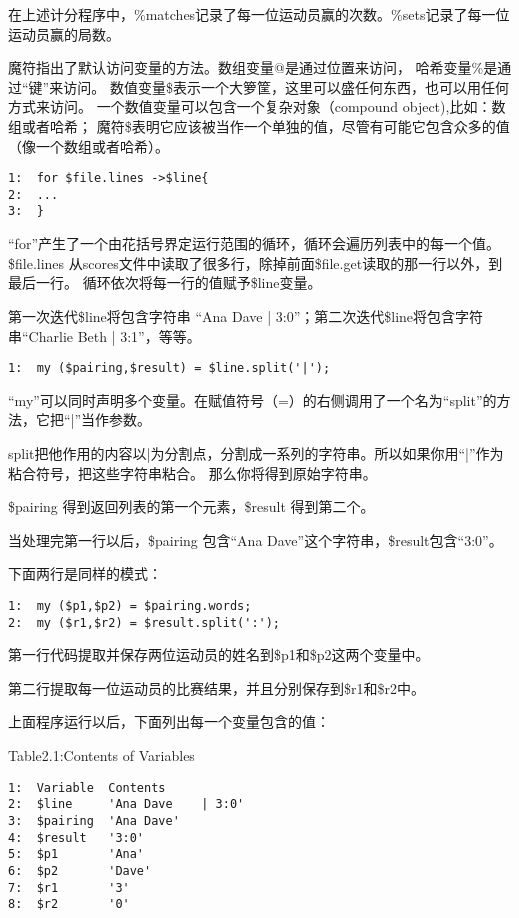\documentclass[11pt]{article}
\begin{document}
在上述计分程序中，\%matches记录了每一位运动员赢的次数。\%sets记录了每一位运动员赢的局数。

魔符指出了默认访问变量的方法。数组变量@是通过位置来访问，
哈希变量\%是通过“键”来访问。
数值变量\$表示一个大箩筐，这里可以盛任何东西，也可以用任何方式来访问。
一个数值变量可以包含一个复杂对象（compound object),比如：数组或者哈希；
魔符\$表明它应该被当作一个单独的值，尽管有可能它包含众多的值（像一个数组或者哈希）。

\begin{verbatim}
1:  for $file.lines ->$line{
2:  ...
3:  }
\end{verbatim}
“for”产生了一个由花括号界定运行范围的循环，循环会遍历列表中的每一个值。
\$file.lines 从scores文件中读取了很多行，除掉前面\$file.get读取的那一行以外，到最后一行。
循环依次将每一行的值赋予\$line变量。

第一次迭代\$line将包含字符串 “Ana Dave | 3:0”；第二次迭代\$line将包含字符串“Charlie Beth | 3:1”，等等。


\begin{verbatim}
1:  my ($pairing,$result) = $line.split('|');
\end{verbatim}
“my”可以同时声明多个变量。在赋值符号（=）的右侧调用了一个名为“split”的方法，它把“|”当作参数。

split把他作用的内容以|为分割点，分割成一系列的字符串。所以如果你用“|”作为粘合符号，把这些字符串粘合。
那么你将得到原始字符串。

\$pairing 得到返回列表的第一个元素，\$result 得到第二个。

当处理完第一行以后，\$pairing 包含“Ana Dave”这个字符串，\$result包含“3:0”。

下面两行是同样的模式：

\begin{verbatim}
1:  my ($p1,$p2) = $pairing.words;
2:  my ($r1,$r2) = $result.split(':');
\end{verbatim}
第一行代码提取并保存两位运动员的姓名到\$p1和\$p2这两个变量中。

第二行提取每一位运动员的比赛结果，并且分别保存到\$r1和\$r2中。

上面程序运行以后，下面列出每一个变量包含的值：


Table2.1:Contents of Variables

\begin{verbatim}
1:  Variable  Contents               
2:  $line     'Ana Dave    | 3:0' 
3:  $pairing  'Ana Dave'              
4:  $result   '3:0'                   
5:  $p1       'Ana'                   
6:  $p2       'Dave'                  
7:  $r1       '3'                     
8:  $r2       '0'
\end{verbatim}
\end{document}
